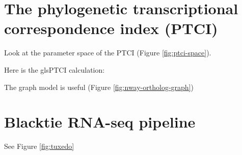 \section{The phylogenetic transcriptional correspondence index (PTCI)}


Look at the parameter space of the \gls{PTCI} (Figure \ref{fig:ptci-space}).



Here is the gls{PTCI} calculation:


The graph model is useful (Figure \ref{fig:nway-ortholog-graph})




\pagebreak[4]
\section{Blacktie RNA-seq pipeline}

See Figure \ref{fig:tuxedo}







